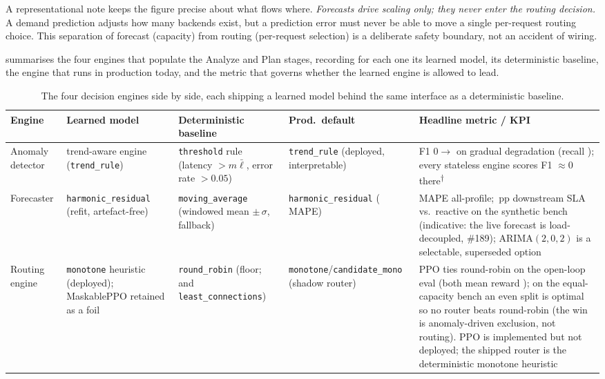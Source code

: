 A representational note keeps the figure precise about what flows where.
\emph{Forecasts drive scaling only; they never enter the routing decision.}
A demand prediction adjusts how many backends exist, but a prediction error
must never be able to move a single per-request routing choice. This separation
of forecast (capacity) from routing (per-request selection) is a deliberate
safety boundary, not an accident of wiring.

 summarises the four engines that populate the Analyze and
Plan stages, recording for each one its learned model, its deterministic
baseline, the engine that runs in production today, and the metric that governs
whether the learned engine is allowed to lead.

\begin{table}[p]
\centering
\caption[The four decision engines side by side]{The four decision engines side by side, each shipping a learned model behind the same interface as a deterministic baseline.}
\label{dsb:tab:engines}
\small
\begin{tabularx}{\linewidth}{@{}l Y Y Y Y@{}}
\toprule
\headrow \textbf{Engine} & \textbf{Learned model} & \textbf{Deterministic baseline} & \textbf{Prod.\ default} & \textbf{Headline metric / KPI} \\
\midrule
Anomaly detector
  & trend-aware engine (\texttt{trend\_\allowbreak rule})
  & \texttt{threshold} rule (latency $>m\bar{\ell}$, error rate $>0.05$)
  & \texttt{trend\_\allowbreak rule} (deployed, interpretable)
  & F1 $0\to{}$\BManFone{} on gradual degradation (recall \BManRecall{}); every stateless engine scores F1 $\approx 0$ there\textsuperscript{$\dagger$} \\
\addlinespace
Forecaster
  & \texttt{harmonic\_\allowbreak residual} (refit, artefact-free)
  & \texttt{moving\_\allowbreak average} (windowed mean $\pm\,\sigma$, fallback)
  & \texttt{harmonic\_\allowbreak residual} (\BMfcMape{} MAPE)
  & \BMfcMape{} MAPE all-profile; \BMfcSlaGain{}\,pp downstream SLA vs.\ reactive on the synthetic bench (indicative: the live forecast is load-decoupled, \#189); ARIMA$(2,0,2)$ is a selectable, superseded option \\
\addlinespace
Routing engine
  & \texttt{monotone} heuristic (deployed); MaskablePPO \cite{schulman2017ppo,raffin2021sb3} retained as a foil
  & \texttt{round\_\allowbreak robin} (floor; and \texttt{least\_\allowbreak connections})
  & \texttt{monotone}/\allowbreak\texttt{candidate\_\allowbreak mono} (shadow router)
  & PPO ties round-robin on the open-loop eval (both mean reward \BMrlPpoReward{}); on the equal-capacity bench an even split is optimal so no router beats round-robin (the win is anomaly-driven exclusion, not routing). PPO is implemented but not deployed; the shipped router is the deterministic monotone heuristic \\

\end{tabularx}
\end{table}
